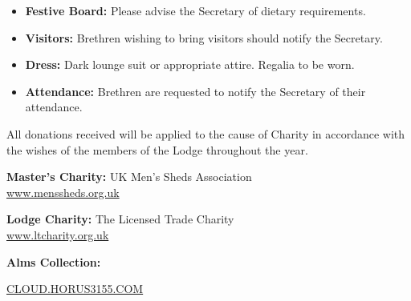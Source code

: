 
\begin{itemize}[leftmargin=*]
\item \textbf{Festive Board:} Please advise the Secretary of dietary requirements.
\item \textbf{Visitors:} Brethren wishing to bring visitors should notify the Secretary.
\item \textbf{Dress:} Dark lounge suit or appropriate attire. Regalia to be worn.
\item \textbf{Attendance:} Brethren are requested to notify the Secretary of their attendance.
\end{itemize}

\vspace{\baselineskip}


{\small
All donations received will be applied to the cause of Charity in accordance with the wishes of the members of the Lodge throughout the year.
}

\vspace{0.5\baselineskip}

\noindent
\begin{minipage}[t]{0.65\textwidth}
\small
\textbf{Master's Charity:} UK Men's Sheds Association\\
\href{https://www.menssheds.org.uk}{www.menssheds.org.uk}

\vspace{0.3\baselineskip}

\textbf{Lodge Charity:} The Licensed Trade Charity\\
\href{https://www.ltcharity.org.uk}{www.ltcharity.org.uk}
\end{minipage}\hfill
\begin{minipage}[t]{0.30\textwidth}
\raggedleft
\textbf{Alms Collection:}\\
\vspace{0.2\baselineskip}
\end{minipage}

\vspace{0.5\baselineskip}

{\centering\small
\href{https://cloud.horus3155.com}{CLOUD.HORUS3155.COM}
\par}
